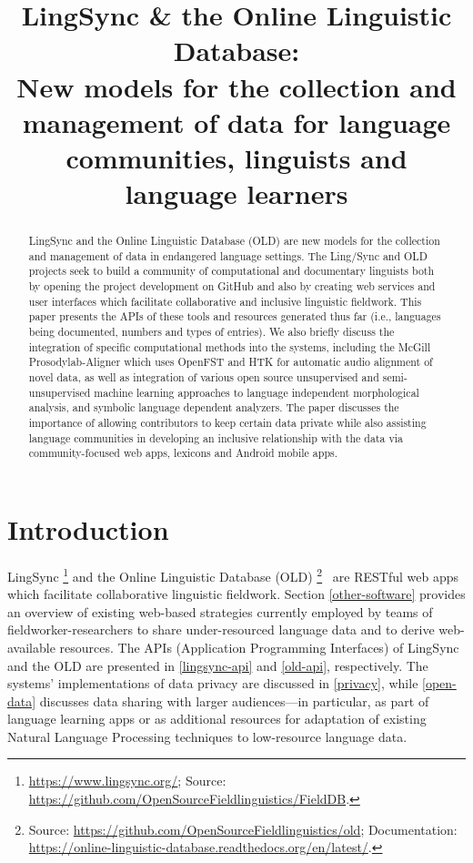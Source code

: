 \documentclass[11pt]{article}
\title{LingSync \& the Online Linguistic Database:\\New models for the
    collection and management of data for language communities, linguists and
language learners}
\date{}
\begin{document}
\maketitle
\begin{abstract}
LingSync and the Online Linguistic Database (OLD) are new models for the
collection and management of data in endangered language settings. The
Ling\-/Sync and OLD projects seek to build a community of computational and
documentary linguists both by opening the project development on GitHub and
also by creating web services and user interfaces which facilitate
collaborative and inclusive linguistic fieldwork. This paper presents the APIs
of these tools and resources generated thus far (i.e., languages being
documented, numbers and types of entries). We also briefly discuss the
integration of specific computational methods into the systems, including the 
McGill Prosodylab-Aligner which uses OpenFST and HTK for automatic audio
alignment of novel data, as well as integration of various  open source
unsupervised and semi-unsupervised machine learning approaches to language
independent morphological analysis, and symbolic language dependent analyzers. 
The paper discusses the importance of allowing contributors to keep certain
data private while also assisting language communities in developing an
inclusive relationship with the data via community-focused web apps, lexicons
and Android mobile apps.
\end{abstract}


\section{Introduction}
LingSync%
\footnote{\url{https://www.lingsync.org/}; Source:
\url{https://github.com/OpenSourceFieldlinguistics/FieldDB}.} %
and the Online Linguistic Database (OLD)%
\footnote{Source: \url{https://github.com/OpenSourceFieldlinguistics/old};
    Documentation:
\url{https://online-linguistic-database.readthedocs.org/en/latest/}.}%
~are RESTful web apps which facilitate collaborative linguistic fieldwork. 
Section \ref{other-software} provides an overview of existing web-based strategies
currently employed by teams of fieldworker-researchers to share under-resourced
language data and to derive web-available resources. The APIs
(Application Programming Interfaces) of LingSync and the OLD are presented in
\autoref{lingsync-api} and \autoref{old-api}, respectively. The systems'
implementations of data privacy are discussed in \autoref{privacy}, while 
\autoref{open-data} discusses data sharing with larger audiences---in
particular, as part of language learning apps or as additional resources for
adaptation of existing Natural Language Processing techniques to low-resource
language data.
\end{document}
